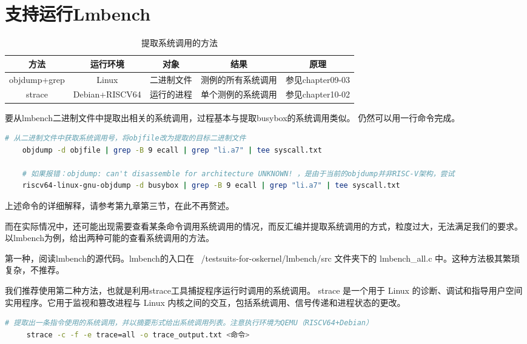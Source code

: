 \section{支持运行Lmbench}
\begin{table}[!ht]
   	\centering
   	\begin{tabular}{|c|c|c|c|c|}
   		\hline
   		\textbf{方法} & \textbf{运行环境} & \textbf{对象} & \textbf{结果} & \textbf{原理} \\
   		\hline
   		objdump+grep & Linux & 二进制文件 & 测例的所有系统调用 & 参见chapter09-03 \\ \hline
   		strace & Debian+RISCV64 & 运行的进程 & 单个测例的系统调用 &  参见chapter10-02 \\
   		\hline
   	\end{tabular}
   	\caption{提取系统调用的方法}
   	\label{提取系统调用的方法}
   \end{table}
要从lmbench二进制文件中提取出相关的系统调用，过程基本与提取busybox的系统调用类似。
仍然可以用一行命令完成。

\begin{lstlisting}[language=bash]
    # 从二进制文件中获取系统调用号，将objfile改为提取的目标二进制文件
    objdump -d objfile | grep -B 9 ecall | grep "li.a7" | tee syscall.txt

    # 如果报错：objdump: can't disassemble for architecture UNKNOWN! ，是由于当前的objdump并非RISC-V架构，尝试
    riscv64-linux-gnu-objdump -d busybox | grep -B 9 ecall | grep "li.a7" | tee syscall.txt

\end{lstlisting}

上述命令的详细解释，请参考第九章第三节，在此不再赘述。

而在实际情况中，还可能出现需要查看某条命令调用系统调用的情况，而反汇编并提取系统调用的方式，粒度过大，无法满足我们的要求。
以lmbench为例，给出两种可能的查看系统调用的方法。

第一种，阅读lmbench的源代码。lmbench的入口在 ~/testsuits-for-oskernel/lmbench/src 文件夹下的 lmbench_all.c 中。这种方法极其繁琐复杂，不推荐。

我们推荐使用第二种方法，也就是利用strace工具捕捉程序运行时调用的系统调用。
strace 是一个用于 Linux 的诊断、调试和指导用户空间实用程序。它用于监视和篡改进程与 Linux 内核之间的交互，包括系统调用、信号传递和进程状态的更改。


\begin{lstlisting}[language=bash]
    # 提取出一条指令使用的系统调用，并以摘要形式给出系统调用列表。注意执行环境为QEMU（RISCV64+Debian）
     strace -c -f -e trace=all -o trace_output.txt <命令>
\end{lstlisting}

